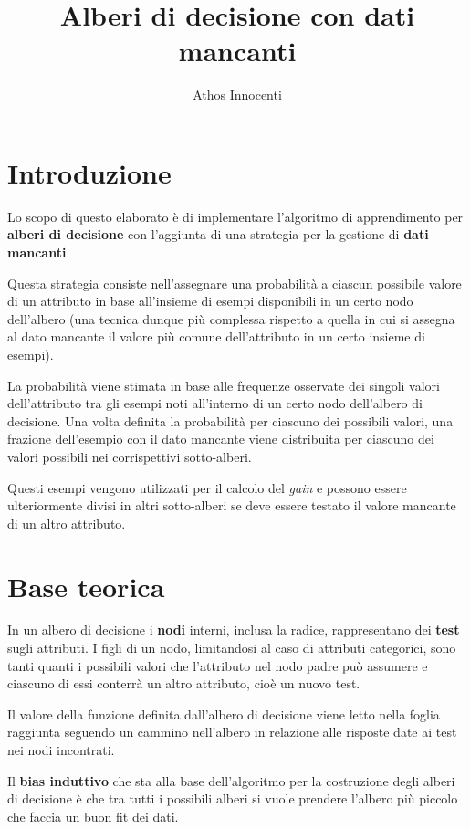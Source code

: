 \documentclass[a4paper, 10pt]{article}
\begin{document}
\title{\textbf{Alberi di decisione con dati mancanti}}\date{}
\author{Athos Innocenti}
\maketitle
\section{Introduzione}
Lo scopo di questo elaborato è di implementare l'algoritmo di apprendimento per \textbf{alberi di decisione} con l'aggiunta di una strategia per la gestione di \textbf{dati mancanti}.

Questa strategia consiste nell'assegnare una probabilità a ciascun possibile valore di un attributo in base all'insieme di esempi disponibili in un certo nodo dell'albero (una tecnica dunque più complessa rispetto a quella in cui si assegna al dato mancante il valore più comune dell'attributo in un certo insieme di esempi).

La probabilità viene stimata in base alle frequenze osservate dei singoli valori dell'attributo tra gli esempi noti all'interno di un certo nodo dell'albero di decisione. Una volta definita la probabilità per ciascuno dei possibili valori, una frazione dell'esempio con il dato mancante viene distribuita per ciascuno dei valori possibili nei corrispettivi sotto-alberi.

Questi esempi vengono utilizzati per il calcolo del \textit{gain} e possono essere ulteriormente divisi in altri sotto-alberi se deve essere testato il valore mancante di un altro attributo. 
\section{Base teorica}
In un albero di decisione i \textbf{nodi} interni, inclusa la radice, rappresentano dei \textbf{test} sugli attributi. I figli di un nodo, limitandosi al caso di attributi categorici, sono tanti quanti i possibili valori che l'attributo nel nodo padre può assumere e ciascuno di essi conterrà un altro attributo, cioè un nuovo test.

Il valore della funzione definita dall'albero di decisione viene letto nella foglia raggiunta seguendo un cammino nell'albero in relazione alle risposte date ai test nei nodi incontrati. 

Il \textbf{bias induttivo} che sta alla base dell'algoritmo per la costruzione degli alberi di decisione è che tra tutti i possibili alberi si vuole prendere l'albero più piccolo che faccia un buon fit dei dati.
\end{document}
